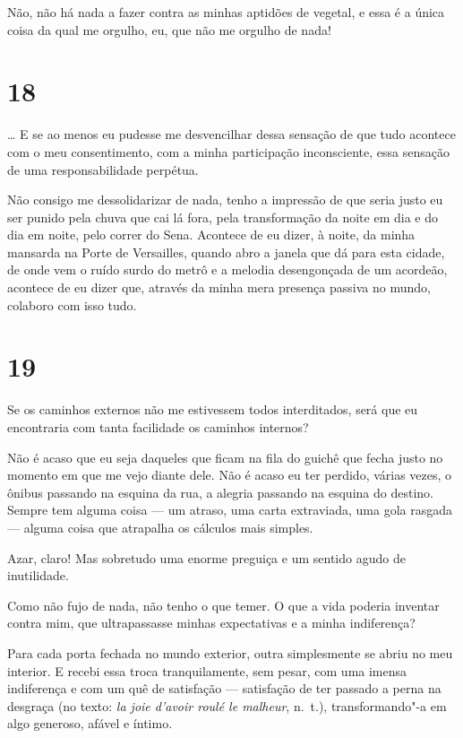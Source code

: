 Não, não há nada a fazer contra as minhas aptidões de vegetal, e essa é
a única coisa da qual me orgulho, eu, que não me orgulho de nada!

\section{18}

\ldots{} E se ao menos eu pudesse me desvencilhar dessa sensação de que
tudo acontece com o meu consentimento, com a minha participação
inconsciente, essa sensação de uma responsabilidade perpétua.

Não consigo me dessolidarizar de nada, tenho a impressão de que seria
justo eu ser punido pela chuva que cai lá fora, pela transformação da
noite em dia e do dia em noite, pelo correr do Sena. Acontece de eu
dizer, à noite, da minha mansarda na Porte de Versailles, quando abro a
janela que dá para esta cidade, de onde vem o ruído surdo do metrô e a
melodia desengonçada de um acordeão, acontece de eu dizer que, através
da minha mera presença passiva no mundo, colaboro com isso tudo.

\section{19}

Se os caminhos externos não me estivessem todos interditados, será que
eu encontraria com tanta facilidade os caminhos internos?

Não é acaso que eu seja daqueles que ficam na fila do guichê que fecha
justo no momento em que me vejo diante dele. Não é acaso eu ter perdido,
várias vezes, o ônibus passando na esquina da rua, a
alegria passando na esquina do destino. Sempre tem alguma coisa --- um
atraso, uma carta extraviada, uma gola rasgada --- alguma coisa que
atrapalha os cálculos mais simples.

Azar, claro! Mas sobretudo uma enorme preguiça e um sentido agudo de
inutilidade.

Como não fujo de nada, não tenho o que temer. O que a vida poderia
inventar contra mim, que ultrapassasse minhas expectativas e a minha
indiferença?

Para cada porta fechada no mundo exterior, outra simplesmente se abriu
no meu interior. E recebi essa troca tranquilamente, sem pesar, com uma
imensa indiferença e com um quê de satisfação --- satisfação de ter
passado a perna na desgraça (no texto: \emph{la joie d'avoir roulé le
malheur}, n.~t.), transformando"-a em algo generoso, afável e íntimo.

